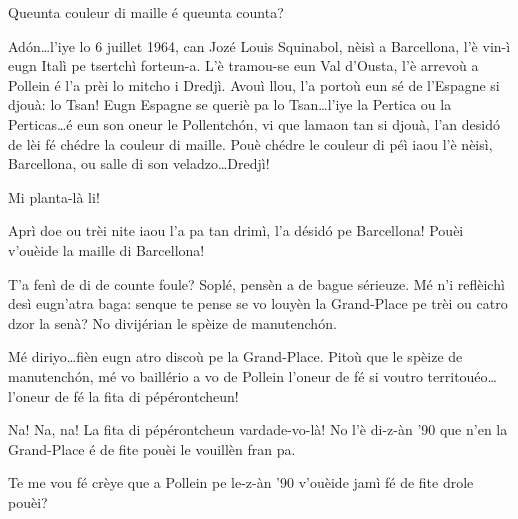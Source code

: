 \begin{drama}
\Taniaspeaks Queunta couleur di maille é queunta counta?

\Laurentspeaks Ad\'on\ldots l'iye lo 6 juillet 1964, can Jozé Louis Squinabol, nèisì a Barcellona, l'è vin-ì eugn Italì pe tsertchì forteun-a. L'è tramou-se eun Val d'Ousta, l'è arrevoù a Pollein é l'a prèi lo mitcho i Dredjì. Avouì llou, l'a portoù eun sé de l'Espagne si djouà: lo Tsan! Eugn Espagne se queriè pa lo Tsan\ldots l'iye la Pertica ou la Perticas\ldots é eun son oneur le Pollentch\'on, vi que lamaon tan si djouà, l'an desid\'o de lèi fé chédre la couleur di maille. Pouè chédre le couleur di péì iaou l'è nèisì, Barcellona, ou salle di son veladzo\ldots Dredjì!

\Taniaspeaks Mi planta-là li!

\Laurentspeaks Aprì doe ou trèi nite iaou l'a pa tan drimì, l'a désid\'o pe Barcellona! Pouèi v'ouèide la maille di Barcellona!

\Taniaspeaks{} T'a fenì de di de counte foule? Soplé, pensèn a de bague sérieuze. Mé n'i reflèichì desì eugn'atra baga: senque te pense se vo louyèn la Grand-Place pe trèi ou catro dzor la senà? No divijérian le spèize de manutench\'on.

\Laurentspeaks{} Mé diriyo\ldots fièn eugn atro discoù pe la Grand-Place. Pitoù que le spèize de manutench\'on, mé vo ba\-illé\-ri\-o a vo de Pollein l'oneur de fé si voutro territouéo\ldots l'o\-neur de fé la fita di pépérontcheun!

\Taniaspeaks Na! Na, na! La fita di pépérontcheun vardade-vo-là! No l'è di-z-àn '90 que n'en la Grand-Place é de fite pouèi le vouillèn fran pa.

\Laurentspeaks Te me vou fé crèye que a Pollein pe le-z-àn '90 v'ouèide jamì fé de fite drole pouèi?


\act[Le-z-àn '90]

\ridoiver



\end{drama}
